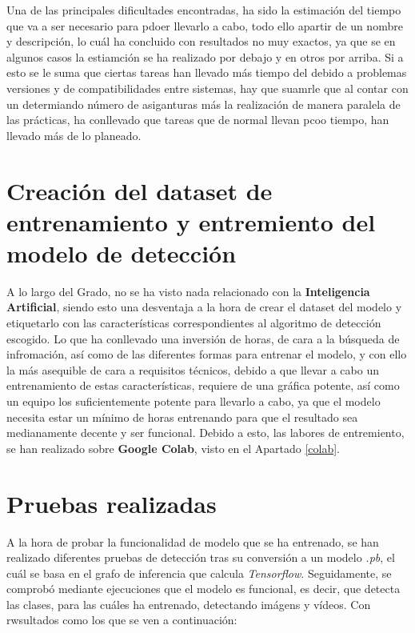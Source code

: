 Una de las principales dificultades encontradas, ha sido la estimación del tiempo que va a ser necesario para pdoer llevarlo a cabo, todo ello apartir de un nombre y descripción, lo cuál ha concluido con resultados no muy exactos, ya que se en algunos casos la estiamción se ha realizado por debajo y en otros por arriba. Si a esto se le suma que ciertas tareas han llevado más tiempo del debido a problemas versiones y de compatibilidades entre sistemas, hay que suamrle que al contar con un determiando número de asiganturas
más la realización de manera paralela de las prácticas, ha conllevado que tareas que de normal llevan pcoo tiempo, han llevado más de lo planeado.

\section{Creación del dataset de entrenamiento y entremiento del modelo de detección}
A lo largo del Grado, no se ha visto nada relacionado con la \textbf{Inteligencia Artificial}, siendo esto una desventaja a la hora de crear el dataset del modelo y etiquetarlo con las características correspondientes al algoritmo de detección escogido. Lo que ha conllevado una inversión de horas, de cara a la búsqueda de infromación, así como de las diferentes formas para entrenar el modelo, y con ello la más asequible de cara a requisitos técnicos, debido a que llevar a cabo un entrenamiento de estas características, 
requiere de una gráfica potente, así como un equipo los suficientemente potente para llevarlo a cabo, ya que el modelo necesita estar un mínimo de horas entrenando para que el resultado sea medianamente decente y ser funcional.
Debido a esto, las labores de entremiento, se han realizado sobre \textbf{Google Colab}, visto en el Apartado \ref{colab}.

\section{Pruebas realizadas}
A la hora de probar la funcionalidad de modelo que se ha entrenado, se han realizado diferentes pruebas de detección tras su conversión a un modelo \textit{.pb}, el cuál se basa en el grafo de inferencia que calcula \textit{Tensorflow}.
Seguidamente, se comprobó mediante ejecuciones que el modelo es funcional, es decir, que detecta las clases, para las cuáles ha entrenado, detectando imágens y vídeos.
Con rwsultados como los que se ven a continuación:


